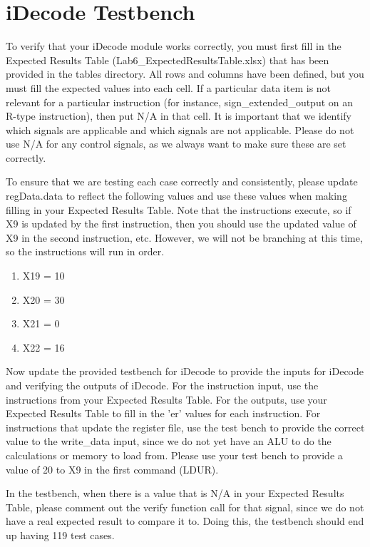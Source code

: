 \section{iDecode Testbench}
To verify that your iDecode module works correctly, you must first fill in the Expected Results Table (Lab6\_ExpectedResultsTable.xlsx) that has been provided in the tables directory. All rows and columns have been defined, but you must fill the expected values into each cell.  If a particular data item is not relevant for a particular instruction (for instance, sign\_extended\_output on an R-type instruction), then put N/A in that cell.  It is important that we identify which signals are applicable and which signals are not applicable.  Please do not use N/A for any control signals, as we always want to make sure these are set correctly.  

To ensure that we are testing each case correctly and consistently, please update regData.data to reflect the following values and use these values when making filling in your Expected Results Table.  Note that the instructions execute, so if X9 is updated by the first instruction, then you should use the updated value of X9 in the second instruction, etc.  However, we will not be branching at this time, so the instructions will run in order.

\begin{enumerate}
	\item X19 = 10
	\item X20 = 30
	\item X21 = 0
	\item X22 = 16
\end{enumerate}

Now update the provided testbench for iDecode to provide the inputs for iDecode and verifying the outputs of iDecode.  For the instruction input, use the instructions from your Expected Results Table.  For the outputs, use your Expected Results Table to fill in the 'er' values for each instruction.  For instructions that update the register file, use the test bench to provide the correct value to the write\_data input, since we do not yet have an ALU to do the calculations or memory to load from.  Please use your test bench to provide a value of 20 to X9 in the first command (LDUR).

In the testbench, when there is a value that is N/A in your Expected Results Table, please comment out the verify function call for that signal, since we do not have a real expected result to compare it to.  Doing this, the testbench should end up having 119 test cases.

